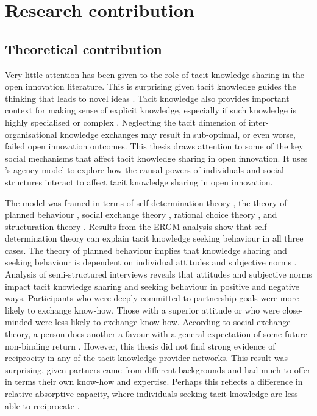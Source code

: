 \section{Research contribution}

\subsection{Theoretical contribution}

Very little attention has been given to the role of tacit knowledge sharing in the open innovation literature. This is surprising given tacit knowledge guides the thinking that leads to novel ideas \citep{brown1997art,leonard1998role,lam2000tacit}. Tacit knowledge also provides important context for making sense of explicit knowledge, especially if such knowledge is highly specialised or complex \citep{von1994sticky,szulanski1996exploring,szulanski2016overcoming}. Neglecting the tacit dimension of inter-organisational knowledge exchanges may result in sub-optimal, or even worse, failed open innovation outcomes. This thesis draws attention to some of the key social mechanisms that affect tacit knowledge sharing in open innovation. It uses \citeauthor{loyal2001agency}'s \citeyearpar{loyal2001agency} agency model to explore how the causal powers of individuals and social structures interact to affect tacit knowledge sharing in open innovation. \medskip

The model was framed in terms of self-determination theory \citep{deci1985conceptualizations}, the theory of planned behaviour \citep{ajzen1985intentions}, social exchange theory \citep{homans1961social,blau1964exchange}, rational choice theory \citep{parsons1937structure,coleman1990foundations}, and structuration theory \citep{giddens1984constitution}. Results from the ERGM analysis show that self-determination theory can explain tacit knowledge seeking behaviour in all three cases. The theory of planned behaviour implies that knowledge sharing and seeking behaviour is dependent on individual attitudes and subjective norms \citep{gagne2009model}. Analysis of semi-structured interviews reveals that attitudes and subjective norms impact tacit knowledge sharing and seeking behaviour in positive and negative ways. Participants who were deeply committed to partnership goals were more likely to exchange know-how. Those with a superior attitude or who were close-minded were less likely to exchange know-how. According to social exchange theory, a person does another a favour with a general expectation of some future non-binding return \citep{homans1961social}. However, this thesis did not find strong evidence of reciprocity in any of the tacit knowledge provider networks. This result was surprising, given partners came from different backgrounds and had much to offer in terms their own know-how and expertise. Perhaps this reflects a difference in relative absorptive capacity, where individuals seeking tacit knowledge are less able to reciprocate \citep{lane1998relative}. \medskip

